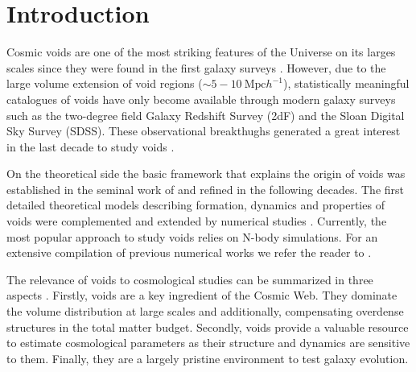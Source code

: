 \documentclass[a4,useAMS,usenatbib,usegraphicx]{mn2e}
\begin{document}

\section{Introduction}
\label{sec:introduction}

Cosmic voids are one of the most striking features of the
Universe on its larges scales since they were found in the first
galaxy surveys \citep{Chincarini75, Gregory78, Einasto80M, Einasto80N,
  Kirshner81, Zeldovich82,Kirshner87}.  
However, due to the large volume extension of void regions ($\sim
5-10\ \mbox{Mpc}  h^{-1}$), statistically meaningful catalogues of
voids \citep{Pan10,  Sutter12b, Nadathur14} have only become available
through modern galaxy surveys such as the two-degree field Galaxy
Redshift Survey (2dF) \citep{ Colless01, Colless03} and the Sloan
Digital Sky Survey (SDSS)\citep{York00, Abazajian03}.
These observational breakthughs generated a great interest in the last
decade to study voids \citep{Hoyle04, Croton04, Rojas05,
  Ceccarelli06, Patiri06a, Tikhonov06, Patiri06b,Tikhonov07,
  BendaBeckmann08, Foster09, Ceccarelli13, Sutter14a}. 


On the theoretical side the basic framework that explains
the origin of voids was established in the seminal work of
\citet{Zeldovich70} and refined in the following decades.  
The first detailed theoretical models describing formation, dynamics
and properties of  voids \citep{Hoffman82, Icke84, Bertschinger85,
  Blumenthal92} were  complemented and extended by numerical studies
\citep{Martel90, Regos91, Weygaert93, Dubinski93, Bond96}. 
Currently, the most popular approach to study voids relies on N-body
simulations. For an extensive compilation of previous  
numerical works we refer the reader to \citet{Colberg08}.


The relevance of voids to cosmological studies can be summarized in
three aspects \citep{Platen07}. 
Firstly, voids are a key ingredient of the Cosmic Web. 
They dominate the volume distribution at large scales and
additionally, compensating overdense structures in the total matter
budget. 
Secondly, voids provide a valuable resource to estimate  
cosmological parameters as their structure and dynamics are sensitive
to them. 
Finally, they are a largely pristine environment to test galaxy
evolution. 
\end{document}
